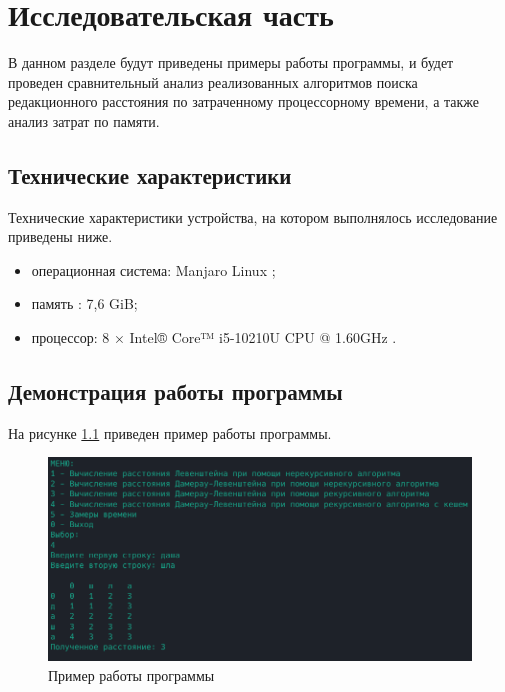 \chapter{Исследовательская часть}

В данном разделе будут приведены примеры работы программы, и будет проведен сравнительный анализ реализованных алгоритмов поиска редакционного расстояния по затраченному процессорному времени, а также анализ затрат по памяти.

\section{Технические характеристики}

Технические характеристики устройства, на котором выполнялось исследование приведены ниже.

\begin{itemize}
	\item операционная система: Manjaro Linux \cite{manjaro};
	\item память : 7,6 GiB;
	\item процессор: 8 × Intel® Core™ i5-10210U CPU @ 1.60GHz \cite{intel}.
\end{itemize}

\clearpage

\section{Демонстрация работы программы}

На рисунке \ref{img:example} приведен пример работы программы.

\begin{figure}[H]
	\begin{center}
		\includegraphics[scale=0.7]{img/example.png}
	\end{center}
	\captionsetup{justification=centering}
	\caption{Пример работы программы}
	\label{img:example}
\end{figure}

